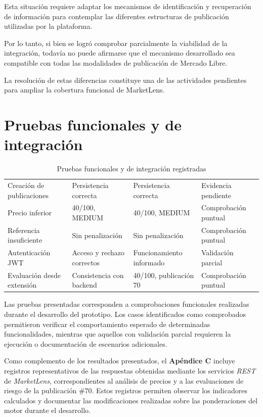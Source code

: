 Esta situación requiere adaptar los mecanismos de identificación y
recuperación de información para contemplar las diferentes estructuras
de publicación utilizadas por la plataforma.

Por lo tanto, si bien se logró comprobar parcialmente la viabilidad de
la integración, todavía no puede afirmarse que el mecanismo desarrollado
sea compatible con todas las modalidades de publicación de Mercado
Libre.

La resolución de estas diferencias constituye una de las actividades
pendientes para ampliar la cobertura funcional de MarketLens.

\section{Pruebas funcionales y de integración}

\begin{table}[H]
\centering
\caption{Pruebas funcionales y de integración registradas}
\label{tab:ml-pruebas}
\scriptsize
\begin{tabularx}{\textwidth}{L L L L}
\toprule
{} &  &  &  \\
\midrule
Creación de publicaciones & Persistencia correcta & Persistencia correcta & Evidencia pendiente \\
Precio inferior & 40/100, MEDIUM & 40/100, MEDIUM & Comprobación puntual \\
Referencia insuficiente & Sin penalización & Sin penalización & Comprobación puntual \\
Autenticación JWT & Acceso y rechazo correctos & Funcionamiento informado & Validación parcial \\
Evaluación desde extensión & Consistencia con backend & 40/100, publicación 70 & Comprobación puntual \\
\bottomrule
\end{tabularx}
\end{table}

Las pruebas presentadas corresponden a comprobaciones funcionales
realizadas durante el desarrollo del prototipo. Los casos identificados
como comprobados permitieron verificar el comportamiento esperado de
determinadas funcionalidades, mientras que aquellos con validación
parcial requieren la ejecución o documentación de escenarios
adicionales.

Como complemento de los resultados presentados, el \textbf{Apéndice C}
incluye registros representativos de las respuestas obtenidas mediante
los servicios \emph{REST} de \emph{MarketLens}, correspondientes al
análisis de precios y a las evaluaciones de riesgo de la publicación
\#70. Estos registros permiten observar los indicadores calculados y
documentar las modificaciones realizadas sobre las ponderaciones del
motor durante el desarrollo.


